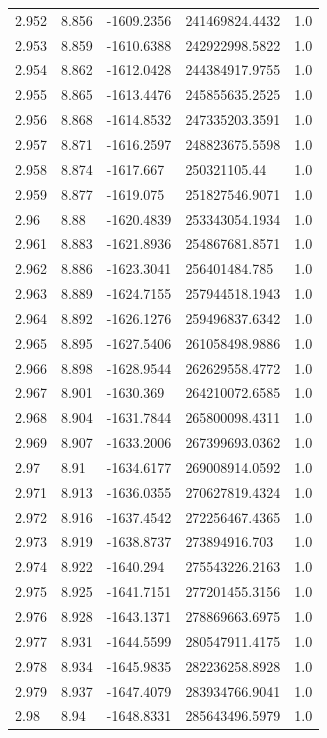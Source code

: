 \begin{tabular}{lllll}
2.952 & 8.856 & -1609.2356 & 241469824.4432 & 1.0 \\
2.953 & 8.859 & -1610.6388 & 242922998.5822 & 1.0 \\
2.954 & 8.862 & -1612.0428 & 244384917.9755 & 1.0 \\
2.955 & 8.865 & -1613.4476 & 245855635.2525 & 1.0 \\
2.956 & 8.868 & -1614.8532 & 247335203.3591 & 1.0 \\
2.957 & 8.871 & -1616.2597 & 248823675.5598 & 1.0 \\
2.958 & 8.874 & -1617.667 & 250321105.44 & 1.0 \\
2.959 & 8.877 & -1619.075 & 251827546.9071 & 1.0 \\
2.96 & 8.88 & -1620.4839 & 253343054.1934 & 1.0 \\
2.961 & 8.883 & -1621.8936 & 254867681.8571 & 1.0 \\
2.962 & 8.886 & -1623.3041 & 256401484.785 & 1.0 \\
2.963 & 8.889 & -1624.7155 & 257944518.1943 & 1.0 \\
2.964 & 8.892 & -1626.1276 & 259496837.6342 & 1.0 \\
2.965 & 8.895 & -1627.5406 & 261058498.9886 & 1.0 \\
2.966 & 8.898 & -1628.9544 & 262629558.4772 & 1.0 \\
2.967 & 8.901 & -1630.369 & 264210072.6585 & 1.0 \\
2.968 & 8.904 & -1631.7844 & 265800098.4311 & 1.0 \\
2.969 & 8.907 & -1633.2006 & 267399693.0362 & 1.0 \\
2.97 & 8.91 & -1634.6177 & 269008914.0592 & 1.0 \\
2.971 & 8.913 & -1636.0355 & 270627819.4324 & 1.0 \\
2.972 & 8.916 & -1637.4542 & 272256467.4365 & 1.0 \\
2.973 & 8.919 & -1638.8737 & 273894916.703 & 1.0 \\
2.974 & 8.922 & -1640.294 & 275543226.2163 & 1.0 \\
2.975 & 8.925 & -1641.7151 & 277201455.3156 & 1.0 \\
2.976 & 8.928 & -1643.1371 & 278869663.6975 & 1.0 \\
2.977 & 8.931 & -1644.5599 & 280547911.4175 & 1.0 \\
2.978 & 8.934 & -1645.9835 & 282236258.8928 & 1.0 \\
2.979 & 8.937 & -1647.4079 & 283934766.9041 & 1.0 \\
2.98 & 8.94 & -1648.8331 & 285643496.5979 & 1.0 \\

\end{tabular}
